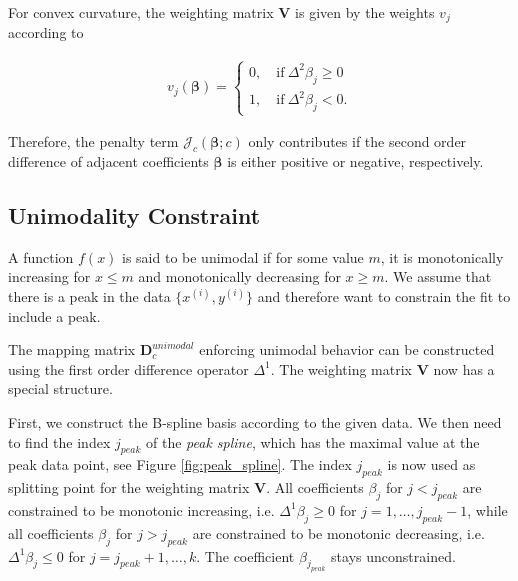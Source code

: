 \documentclass[10pt,a4paper]{article}
\begin{document}
	For convex curvature, the weighting matrix $\boldsymbol{V}$ is given by the weights $v_j$ according to

	\begin{align}\label{eq:v_curvature_convex}
		v_j(\boldsymbol{\beta}) = \begin{cases} 
										0, \quad \text{if} \ \Delta^2\beta_j \ge 0 \\ 
										1, \quad \text{if} \ \Delta^2\beta_j < 0. 
								  \end{cases}
	\end{align}	
	
	Therefore, the penalty term $\mathcal{J}_c(\boldsymbol{\beta}; c)$ only contributes if the second order difference of adjacent coefficients $\boldsymbol{\beta}$ is either positive or negative, respectively. \cite{eilers2005unimodal}
	
	\subsection{Unimodality Constraint}
	
	A function $f(x)$ is said to be unimodal if for some value $m$, it is monotonically increasing for $x \le m$ and monotonically decreasing for $x \ge m$. We assume that there is a peak in the data $\{x^{(i)}, y^{(i)}\}$ and therefore want to constrain the fit to include a peak.
	
	The mapping matrix $\boldsymbol{D}_c^{unimodal}$ enforcing unimodal behavior can be constructed using the first order difference operator $\Delta^1$. The weighting matrix $\boldsymbol{V}$ now has a special structure. 
	
	First, we construct the B-spline basis according to the given data. We then need to find the index $j_{peak}$ of the \emph{peak spline}, which has the maximal value at the peak data point, see Figure \ref{fig:peak_spline}. The index $j_{peak}$ is now used as splitting point for the weighting matrix $\boldsymbol{V}$. All coefficients $\beta_j$ for $j < j_{peak}$ are constrained to be monotonic increasing, i.e. $\Delta^1 \beta_j \ge 0$ for $j = 1, \dots, j_{peak}-1$, while all coefficients $\beta_j$ for $j > j_{peak}$ are constrained to be monotonic decreasing, i.e. $\Delta^1 \beta_j \le 0$ for $j = j_{peak}+1, \dots, k$. The coefficient $\beta_{j_{peak}}$ stays unconstrained. \cite{eilers2005unimodal} 
	
\end{document}
